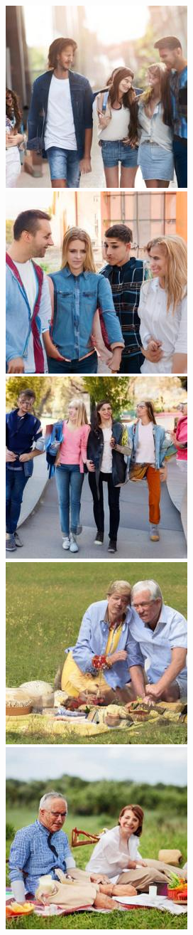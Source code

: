 \begin{figure}[h!]
\begin{subfigure}[t]{0.32\linewidth}
    	\includegraphics[width=0.32\linewidth]{figs/samples_appendix_4/base_cfg_2_ode_prompt_35_image_0.jpg}\;%
    	\includegraphics[width=0.32\linewidth]{figs/samples_appendix_4/base_cfg_2_ode_prompt_35_image_1.jpg}\;%
    	\includegraphics[width=0.32\linewidth]{figs/samples_appendix_4/base_cfg_2_ode_prompt_35_image_2.jpg}\\ 
    	\includegraphics[width=0.32\linewidth]{figs/samples_appendix_4/base_cfg_2_ode_prompt_51_image_0.jpg}\;%
    	\includegraphics[width=0.32\linewidth]{figs/samples_appendix_4/base_cfg_2_ode_prompt_51_image_1.jpg}\;%

\end{subfigure}
\end{figure}
